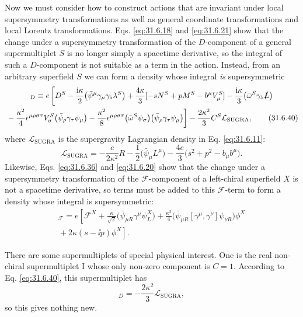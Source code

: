 Now we must consider how to construct actions that are invariant under
local supersymmetry transformations as well as general coordinate
transformations and local Lorentz transformations.
Eqs. \eqref{eq:31.6.18} and \eqref{eq:31.6.21} show that the change
under a supersymmetry transformation of the \(D\)-component of a
general supermultiplet \(S\) is no longer simply a spacetime derivative,
so the integral of such a \(D\)-component is not suitable as a term in
the action. Instead, from an arbitrary superfield \(S\) we can form a
density whose integral \emph{is} supersymmetric
\begin{multline}
  [S]_D\equiv
  e\left[
    D^S-\frac{\ii\kappa}{2}
      \bigl(\bar\psi^\mu\gamma_\mu\gamma_5\lambda^S\bigr)
    +\frac{4\kappa}{3}
      [-sN^S+pM^S-b^\mu V_\mu^S]
    -\frac{\ii\kappa}{3}
      \bigl(\bar\omega^S\gamma_5\sl{L}\bigr)\right.\\
  \left.
    {}-\frac{\kappa^2}{4}\epsilon^{\mu\rho\sigma\tau}V_\sigma^S
      \bigl(\bar\psi_\rho\gamma_\tau\psi_\mu\bigr)
    -\frac{\kappa^2}{8}\epsilon^{\mu\rho\sigma\tau}
      \bigl(\bar\omega^S\psi_\sigma\bigr)
      \bigl(\bar\psi_\rho\gamma_\tau\psi_\mu\bigr)
  \right]
  -\frac{2\kappa^2}{3}C^S\mathcal L_{\mathrm{SUGRA}},
  \tag{31.6.40}\label{eq:31.6.40}
\end{multline}
where \(\mathcal L_{\mathrm{SUGRA}}\) is the supergravity Lagrangian
density in Eq. \eqref{eq:31.6.11}:
\begin{equation}
  \mathcal L_{\mathrm{SUGRA}}
  =-\frac{e}{2\kappa^2}R
   -\frac{1}{2}\bigl(\bar\psi_\mu L^\mu\bigr)
   -\frac{4e}{3}\bigl(s^2+p^2-b_\mu b^\mu\bigr).
  \tag{31.6.41}\label{eq:31.6.41}
\end{equation}
Likewise, Eqs. \eqref{eq:31.6.36} and \eqref{eq:31.6.20} show that the
change under a supersymmetry transformation of the
\(\mathcal F\)-component of a left-chiral superfield \(X\) is not a
spacetime derivative, so terms must be added to this
\(\mathcal F\)-term to form a density whose integral is supersymmetric:
\begin{multline}
  [X]_{\mathcal F}
  =e\left[
    \mathcal F^X
    +\frac{\kappa}{\sqrt{2}}
      \bigl(\bar\psi_{\mu R}\gamma^\mu\psi_L^X\bigr)
    +\frac{\kappa^2}{4}
      \bigl(\bar\psi_{\mu R}[\gamma^\mu,\gamma^\nu]\psi_{\nu R}\bigr)
      \phi^X\right.\\
  \left.
    {}+2\kappa(s-\ii p)\phi^X
  \right].
  \tag{31.6.42}\label{eq:31.6.42}
\end{multline}

There are some supermultiplets of special physical interest. One is the
real non-chiral supermultiplet \(\mathrm I\) whose only non-zero
component is \(C=1\). According to Eq. \eqref{eq:31.6.40}, this
supermultiplet has
\begin{equation}
  [\mathrm I]_D=-\frac{2\kappa^2}{3}\mathcal L_{\mathrm{SUGRA}},
  \tag{31.6.43}\label{eq:31.6.43}
\end{equation}
so this gives nothing new.

